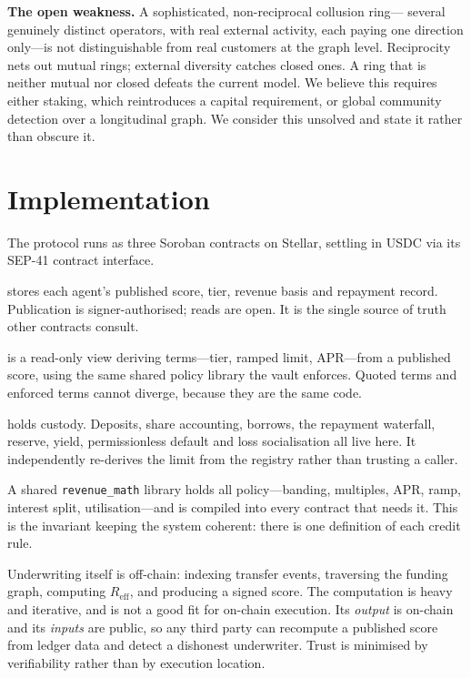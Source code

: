 \documentclass[11pt,a4paper]{article}
\begin{document}
\textbf{The open weakness.} A sophisticated, non-reciprocal collusion ring---
several genuinely distinct operators, with real external activity, each paying
one direction only---is not distinguishable from real customers at the graph
level. Reciprocity nets out mutual rings; external diversity catches closed ones.
A ring that is neither mutual nor closed defeats the current model. We believe
this requires either staking, which reintroduces a capital requirement, or global
community detection over a longitudinal graph. We consider this unsolved and
state it rather than obscure it.

\section{Implementation}

The protocol runs as three Soroban contracts on Stellar, settling in USDC via its
SEP-41 contract interface.

\begin{description}[leftmargin=1.3em,style=unboxed,itemsep=0.3em]
\item[\texttt{score\_registry}] stores each agent's published score, tier,
revenue basis and repayment record. Publication is signer-authorised; reads are
open. It is the single source of truth other contracts consult.

\item[\texttt{credit\_line}] is a read-only view deriving terms---tier, ramped
limit, APR---from a published score, using the same shared policy library the
vault enforces. Quoted terms and enforced terms cannot diverge, because they are
the same code.

\item[\texttt{lending\_vault}] holds custody. Deposits, share accounting,
borrows, the repayment waterfall, reserve, yield, permissionless default and loss
socialisation all live here. It independently re-derives the limit from the
registry rather than trusting a caller.
\end{description}

A shared \texttt{revenue\_math} library holds all policy---banding, multiples,
APR, ramp, interest split, utilisation---and is compiled into every contract that
needs it. This is the invariant keeping the system coherent: there is one
definition of each credit rule.

Underwriting itself is off-chain: indexing transfer events, traversing the
funding graph, computing $R_{\mathrm{eff}}$, and producing a signed score. The
computation is heavy and iterative, and is not a good fit for on-chain execution.
Its \emph{output} is on-chain and its \emph{inputs} are public, so any third
party can recompute a published score from ledger data and detect a dishonest
underwriter. Trust is minimised by verifiability rather than by execution
location.
\end{document}
